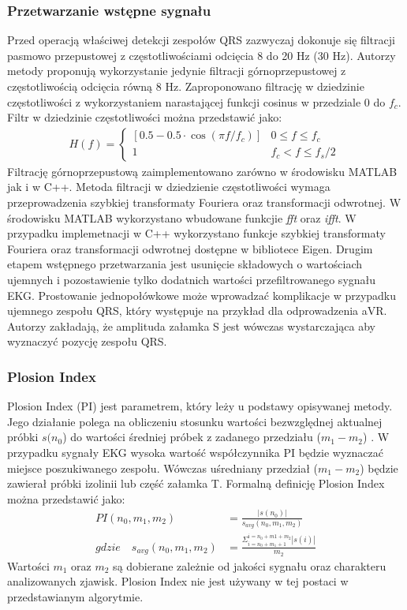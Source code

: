 \documentclass[a4paper,10pt]{article} %
\begin{document}
\subsubsection{Przetwarzanie wstępne sygnału}
Przed operacją właściwej detekcji zespołów QRS zazwyczaj dokonuje się filtracji pasmowo przepustowej z częstotliwościami odcięcia 8 do 20 Hz (30 Hz). Autorzy metody proponują wykorzystanie jedynie filtracji górnoprzepustowej z częstotliwością odcięcia równą 8 Hz. Zaproponowano filtrację w dziedzinie częstotliwości z wykorzystaniem narastającej funkcji cosinus w przedziale $0$ do $f_c$. Filtr w dziedzinie częstotliwości można przedstawić jako:
\begin{align}
 H(f) =
 \begin{cases}
 [0.5-0.5\cdot\cos(\pi f/f_c)]  &0\leq f \leq f_c    \\
 1 &  f_c < f \leq f_s/2
\end{cases}\
\end{align}
Filtrację górnoprzepustową zaimplementowano zarówno w środowisku MATLAB jak i w C++. Metoda filtracji w dziedzienie częstotliwości wymaga przeprowadzenia szybkiej transformaty Fouriera oraz transformacji odwrotnej. W środowisku MATLAB wykorzystano wbudowane funkcjie \textit{fft} oraz \textit{ifft}. W przypadku implemetnacji w C++ wykorzystano funkcje szybkiej transformaty Fouriera oraz transformacji odwrotnej dostępne w bibliotece Eigen. Drugim etapem wstępnego przetwarzania jest usunięcie składowych o wartościach ujemnych i pozostawienie tylko dodatnich wartości przefiltrowanego sygnału EKG. Prostowanie jednopołówkowe może wprowadzać komplikacje w przypadku ujemnego zespołu QRS, który występuje na przykład dla odprowadzenia aVR. Autorzy zakładają, że amplituda załamka S jest wówczas wystarczająca aby wyznaczyć pozycję zespołu QRS. 

\subsubsection{Plosion Index}
Plosion Index (PI) jest parametrem, który leży u podstawy opisywanej metody. Jego działanie polega na obliczeniu stosunku wartości bezwzględnej aktualnej próbki $s(n_0$) do wartości średniej próbek z zadanego przedziału ($m_1 - m_2$) \cite{dpi}. W przypadku sygnały EKG wysoka wartość współczynnika PI będzie wyznaczać miejsce poszukiwanego zespołu. Wówczas uśredniany przedział ($m_1 - m_2$) będzie zawierał próbki izolinii lub część załamka T. Formalną definicję Plosion Index można przedstawić jako:
\begin{align}
	PI(n_0,m_1,m_2) &= \frac{|s(n_0)|}{s_{avg}(n_0,m_1,m_2)} \\
	gdzie \quad s_{avg}(n_0,m_1,m_2) &= \frac{\Sigma_{i=n_0+m_1+1}^{i=n_0+m1+m_2}|s(i)|}{m_2}
\end{align}
Wartości $m_1$ oraz $m_2$ są dobierane zależnie od jakości sygnału oraz charakteru analizowanych zjawisk.
Plosion Index nie jest używany w tej postaci w przedstawianym algorytmie.
\end{document}
